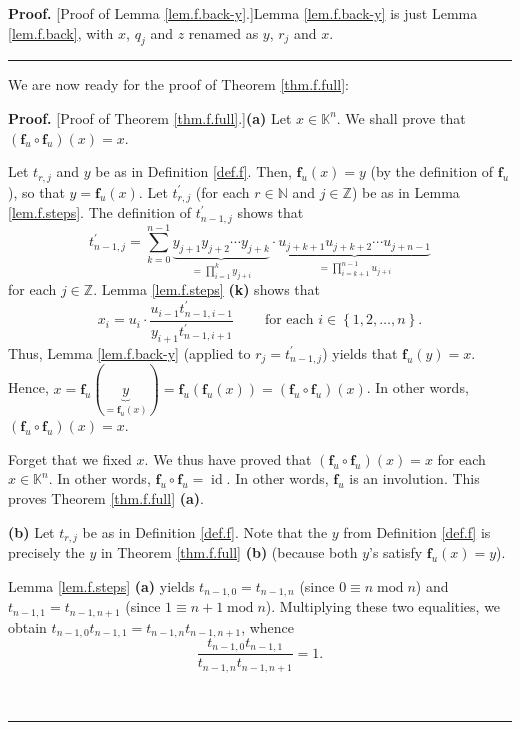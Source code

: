 \documentclass[numbers=enddot,12pt,final,onecolumn,notitlepage]{scrartcl}%
\theoremstyle{definition}
\newenvironment{proof}[1][Proof]{\noindent\textbf{#1.} }{\ \rule{0.5em}{0.5em}}
\let\sumnonlimits\sum
\let\prodnonlimits\prod
\renewcommand{\sum}{\sumnonlimits\limits}
\renewcommand{\prod}{\prodnonlimits\limits}
\begin{document}
\begin{proof}
[Proof of Lemma \ref{lem.f.back-y}.]Lemma \ref{lem.f.back-y} is just Lemma
\ref{lem.f.back}, with $x$, $q_{j}$ and $z$ renamed as $y$, $r_{j}$ and $x$.
\end{proof}

We are now ready for the proof of Theorem \ref{thm.f.full}:

\begin{proof}
[Proof of Theorem \ref{thm.f.full}.]\textbf{(a)} Let $x\in\mathbb{K}^{n}$. We
shall prove that $\left(  \mathbf{f}_{u}\circ\mathbf{f}_{u}\right)  \left(
x\right)  =x$.

Let $t_{r,j}$ and $y$ be as in Definition \ref{def.f}. Then, $\mathbf{f}%
_{u}\left(  x\right)  =y$ (by the definition of $\mathbf{f}_{u}$), so that
$y=\mathbf{f}_{u}\left(  x\right)  $. Let $t_{r,j}^{\prime}$ (for each
$r\in\mathbb{N}$ and $j\in\mathbb{Z}$) be as in Lemma \ref{lem.f.steps}. The
definition of $t_{n-1,j}^{\prime}$ shows that%
\[
t_{n-1,j}^{\prime}=\sum_{k=0}^{n-1}\underbrace{y_{j+1}y_{j+2}\cdots y_{j+k}%
}_{=\prod_{i=1}^{k}y_{j+i}}\cdot\underbrace{u_{j+k+1}u_{j+k+2}\cdots
u_{j+n-1}}_{=\prod_{i=k+1}^{n-1}u_{j+i}}%
\]
for each $j\in\mathbb{Z}$. Lemma \ref{lem.f.steps} \textbf{(k)} shows that%
\[
x_{i}=u_{i}\cdot\dfrac{u_{i-1}t_{n-1,i-1}^{\prime}}{y_{i+1}t_{n-1,i+1}%
^{\prime}}\ \ \ \ \ \ \ \ \ \ \text{for each }i\in\left\{  1,2,\ldots
,n\right\}  .
\]
Thus, Lemma \ref{lem.f.back-y} (applied to $r_{j}=t_{n-1,j}^{\prime}$) yields
that $\mathbf{f}_{u}\left(  y\right)  =x$. Hence, $x=\mathbf{f}_{u}\left(
\underbrace{y}_{=\mathbf{f}_{u}\left(  x\right)  }\right)  =\mathbf{f}%
_{u}\left(  \mathbf{f}_{u}\left(  x\right)  \right)  =\left(  \mathbf{f}%
_{u}\circ\mathbf{f}_{u}\right)  \left(  x\right)  $. In other words, $\left(
\mathbf{f}_{u}\circ\mathbf{f}_{u}\right)  \left(  x\right)  =x$.

Forget that we fixed $x$. We thus have proved that $\left(  \mathbf{f}%
_{u}\circ\mathbf{f}_{u}\right)  \left(  x\right)  =x$ for each $x\in
\mathbb{K}^{n}$. In other words, $\mathbf{f}_{u}\circ\mathbf{f}_{u}%
=\operatorname*{id}$. In other words, $\mathbf{f}_{u}$ is an involution. This
proves Theorem \ref{thm.f.full} \textbf{(a)}.

\textbf{(b)} Let $t_{r,j}$ be as in Definition \ref{def.f}. Note that the $y$
from Definition \ref{def.f} is precisely the $y$ in Theorem \ref{thm.f.full}
\textbf{(b)} (because both $y$'s satisfy $\mathbf{f}_{u}\left(  x\right)  =y$).

Lemma \ref{lem.f.steps} \textbf{(a)} yields $t_{n-1,0}=t_{n-1,n}$ (since
$0\equiv n\operatorname{mod}n$) and $t_{n-1,1}=t_{n-1,n+1}$ (since $1\equiv
n+1\operatorname{mod}n$). Multiplying these two equalities, we obtain
$t_{n-1,0}t_{n-1,1}=t_{n-1,n}t_{n-1,n+1}$, whence
\begin{equation}
\dfrac{t_{n-1,0}t_{n-1,1}}{t_{n-1,n}t_{n-1,n+1}}=1. \label{pf.thm.f.full.b.1}%
\end{equation}



\end{proof}
\end{document}
